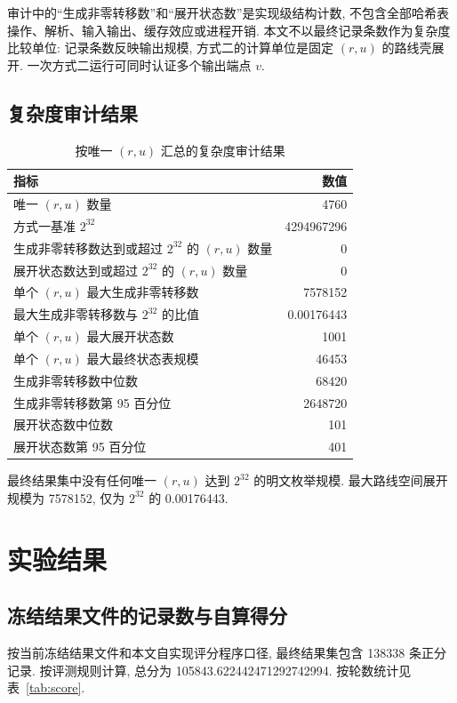 \documentclass[UTF8,a4paper,zihao=-4,fontset=fandol]{ctexart}
\numberwithin{equation}{section}
\theoremstyle{definition}
\theoremstyle{plain}
\theoremstyle{remark}
\begin{document}
审计中的“生成非零转移数”和“展开状态数”是实现级结构计数, 不包含全部哈希表操作、解析、输入输出、缓存效应或进程开销. 本文不以最终记录条数作为复杂度比较单位: 记录条数反映输出规模, 方式二的计算单位是固定 $(r,u)$ 的路线壳展开. 一次方式二运行可同时认证多个输出端点 $v$.

\subsection{复杂度审计结果}

\begin{table}[H]
\centering
\caption{按唯一 $(r,u)$ 汇总的复杂度审计结果}
\label{tab:complexity}
\begin{tabularx}{0.93\textwidth}{L r}
\toprule
指标 & 数值 \\
\midrule
唯一 $(r,u)$ 数量 & 4760 \\
方式一基准 $2^{32}$ & 4294967296 \\
生成非零转移数达到或超过 $2^{32}$ 的 $(r,u)$ 数量 & 0 \\
展开状态数达到或超过 $2^{32}$ 的 $(r,u)$ 数量 & 0 \\
单个 $(r,u)$ 最大生成非零转移数 & 7578152 \\
最大生成非零转移数与 $2^{32}$ 的比值 & 0.00176443 \\
单个 $(r,u)$ 最大展开状态数 & 1001 \\
单个 $(r,u)$ 最大最终状态表规模 & 46453 \\
生成非零转移数中位数 & 68420 \\
生成非零转移数第 95 百分位 & 2648720 \\
展开状态数中位数 & 101 \\
展开状态数第 95 百分位 & 401 \\
\bottomrule
\end{tabularx}
\end{table}

最终结果集中没有任何唯一 $(r,u)$ 达到 $2^{32}$ 的明文枚举规模. 最大路线空间展开规模为 7578152, 仅为 $2^{32}$ 的 0.00176443.

\section{实验结果}

\subsection{冻结结果文件的记录数与自算得分}

按当前冻结结果文件和本文自实现评分程序口径, 最终结果集包含 138338 条正分记录. 按评测规则计算, 总分为 105843.622442471292742994. 按轮数统计见表~\ref{tab:score}.
\end{document}
